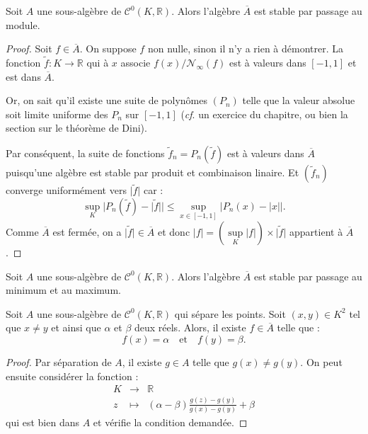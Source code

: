 \documentclass[french]{article}
\newcommand{\R}{\mathbb{R}}
\theoremstyle{plain}
\theoremstyle{definition}
\theoremstyle{remark}
\begin{document}
\begin{lem}%
	Soit $A$ une sous-algèbre de $\mathcal{C}^0(K,\R)$. Alors l'algèbre $\overline{A}$ est stable par passage au module.
\end{lem}
\begin{proof}
	Soit $f\in\overline{A}$. On suppose $f$ non nulle, sinon il n'y a rien à démontrer. La fonction $\tilde{f}:K\to\R$ qui à $x$ associe $f(x)/\mathcal{N}_\infty(f)$ est à valeurs dans $[-1,1]$ et est dans $\overline{A}$.
	
	Or, on sait qu'il existe une suite de polynômes $(P_n)$ telle que la valeur absolue soit limite uniforme des $P_n$ sur $[-1,1]$ (\textit{cf}. un exercice du chapitre, ou bien la section sur le théorème de Dini). 
	
	Par conséquent, la suite de fonctions $\tilde{f}_n=P_n(\tilde f)$ est à valeurs dans $\overline{A}$ puisqu'une algèbre est stable par produit et combinaison linaire. Et $(\tilde{f}_n)$ converge uniformément vers $\lvert \tilde{f}\rvert$ car :
	$$\underset{K}{\sup}\lvert P_n(\tilde{f})-\lvert\tilde{f}\rvert\rvert\leqslant\underset{x\in[-1,1]}{\sup}\lvert P_n(x)-\lvert x\rvert\rvert.$$
	Comme $\overline{A}$ est fermée, on a $\lvert\tilde{f}\rvert\in\overline{A}$ et donc $\lvert f\rvert=(\underset{K}{\sup}\lvert f\rvert)\times\lvert\tilde{f}\rvert$ appartient à $\overline{A}$.
\end{proof}

\begin{cor}%
	Soit $A$ une sous-algèbre de $\mathcal{C}^0(K,\R)$. Alors l'algèbre $\overline{A}$ est stable par passage au minimum et au maximum.
\end{cor}

\begin{lem}%
	Soit $A$ une sous-algèbre de $\mathcal{C}^0(K,\R)$ qui sépare les points. Soit $(x,y)\in K^2$ tel que $x\ne y$ et ainsi que $\alpha$ et $\beta$ deux réels. Alors, il existe $f\in\overline{A}$ telle que :
	$$f(x)=\alpha\quad\text{et}\quad f(y)=\beta.$$ 
\end{lem}
\begin{proof}
	Par séparation de $A$, il existe $g\in A$ telle que $g(x)\ne g(y)$. On peut ensuite considérer la fonction :
	$$\begin{array}{rcl}
		K&\longrightarrow&\R\\
		z&\longmapsto&\displaystyle(\alpha-\beta)\frac{g(z)-g(y)}{g(x)-g(y)}+\beta
	\end{array}$$ qui est bien dans $A$ et vérifie la condition demandée.
\end{proof}
\end{document}
